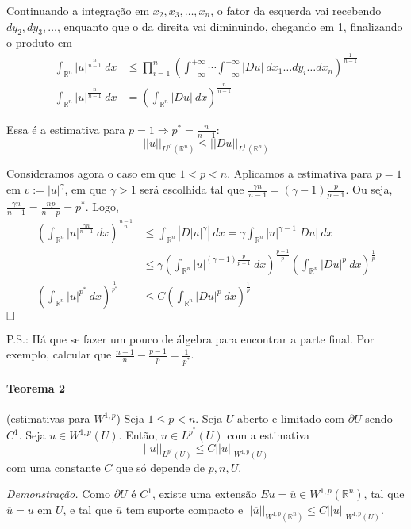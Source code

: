 \documentclass[a4paper, 11pt]{article}
\newcommand{\qed}{$\hfill\square$}
\newcommand{\Rn}{{\mathbb{R}^n}}
\newcommand{\pu}{\partial U}
\newcommand{\nor}[2]{||#1||_{#2}}
\begin{document}
Continuando a integração em $x_2, x_3, \ldots, x_n$, o fator da esquerda vai recebendo $dy_2, dy_3, \ldots$, enquanto que o da direita vai diminuindo, chegando em 1, finalizando o produto em \begin{align*}
	\int_\Rn |u|^{\frac{n}{n-1}}\ dx &\leq \prod_{i=1}^{n} \left(  \int_{-\infty}^{+\infty} \cdots \int_{-\infty}^{+\infty} |Du|\ dx_1 \ldots dy_i \ldots dx_n \right)^{\frac{1}{n-1}}\\
		\int_\Rn |u|^{\frac{n}{n-1}}\ dx &= \left( \int_{\Rn} |Du|\ dx \right)^{\frac{n}{n-1}}
\end{align*}  

Essa é a estimativa para $p=1 \Rightarrow p^* = \frac{n}{n-1}$: \[ ||u||_{L^{p^*}(\Rn)} \leq ||Du||_{L^1(\Rn)} \]



Consideramos agora o caso em que $ 1 < p < n $. Aplicamos a estimativa para $p=1$ em $v:= |u|^\gamma$, em que $\gamma>1$ será escolhida tal que $ \frac{\gamma n}{n-1} = (\gamma -1 ) \frac{p}{p-1} $. Ou seja, $ \frac{\gamma n}{n-1} = \frac{np}{n-p} = p^*$. Logo, \begin{align*}
	\left(\int_\Rn |u|^{\frac{\gamma n}{n-1}}\ dx \right)^{\frac{n-1}{n}} &\leq \int_\Rn \left| D|u|^\gamma \right|\ dx = \gamma \int_\Rn |u|^{\gamma -1} |Du|\ dx \\
	&\leq \gamma \left(  \int_\Rn |u|^{(\gamma -1) \frac{p}{p-1}}\ dx \right)^{\frac{p-1}{p}} \left( \int_\Rn |Du|^p\ dx \right)^{\frac{1}{p}} \\
	\left(\int_\Rn |u|^{p^*}\ dx \right)^{\frac{1}{p^*}} &\leq C \left( \int_\Rn |Du|^p\ dx \right)^{\frac{1}{p}}
\end{align*}\qed


P.S.: Há que se fazer um pouco de álgebra para encontrar a parte final. Por exemplo, calcular que $ \frac{n-1}{n} - \frac{p-1}{p} = \frac{1}{p^*}$.



\paragraph{Teorema 2}\label{t:sobolev-ineq-t2}(estimativas para \( W^{1,p} \)) Seja \( 1\leq p < n \). Seja \(U\) aberto e limitado com \(\partial U\) sendo \(C^1\). Seja \(u \in W^{1,p}(U)\). Então, \(u \in L^{p^*}(U)\) com a estimativa \[ ||u||_{L^{p^*}(U)} \leq C ||u||_{W^{1,p}(U)} \] com uma constante \(C\) que só depende de \(p, n, U\).

\textit{Demonstração.} Como $\pu$ é $C^1$, existe uma extensão $Eu=\overline{u} \in W^{1,p}(\Rn)$, tal que $\overline{u}=u \text{ em } U$, e tal que $\overline{u}$ tem suporte compacto e $ \nor{\overline{u}}{W^{1,p}(\Rn)} \leq C \nor{u}{W^{1,p}(U)} $.
\end{document}
